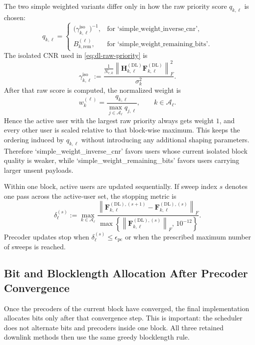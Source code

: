 \documentclass[11pt]{article}
\newcommand{\Aset}{\mathcal{A}}
\newcommand{\F}{\mathbf{F}}
\newcommand{\Hc}{\mathbf{H}}
\newcommand{\norm}[1]{\left\lVert #1 \right\rVert}
\newcommand{\DL}{\mathrm{DL}}
\begin{document}
The two simple weighted variants differ only in how the raw priority score $q_{k,\ell}$ is chosen:
\begin{equation}
q_{k,\ell}
=
\begin{cases}
\bigl(\gamma_{k,\ell}^{\mathrm{iso}}\bigr)^{-1},
&
\text{for `simple\_weight\_inverse\_cnr'},
\\[1mm]
B_{k,\mathrm{rem}}^{(\ell)},
&
\text{for `simple\_weight\_remaining\_bits'}.
\end{cases}
\label{eq:dl-raw-priority}
\end{equation}
The isolated CNR used in \eqref{eq:dl-raw-priority} is
\begin{equation}
\gamma_{k,\ell}^{\mathrm{iso}}
:=
\frac{
\frac{1}{N_{r,k}}
\norm{\Hc_{k,\ell}^{(\DL)}\F_{k,\ell}^{(\DL)}}_F^2
}{
\sigma_k^2
}.
\label{eq:dl-iso-cnr}
\end{equation}
After that raw score is computed, the normalized weight is
\begin{equation}
w_k^{(\ell)}
=
\frac{q_{k,\ell}}{\max_{j \in \Aset_\ell} q_{j,\ell}},
\qquad
k \in \Aset_\ell.
\label{eq:dl-weight-normalization}
\end{equation}
Hence the active user with the largest raw priority always gets weight $1$, and every other user is scaled relative to that block-wise maximum. This keeps the ordering induced by $q_{k,\ell}$ without introducing any additional shaping parameters. Therefore `simple\_weight\_inverse\_cnr' favors users whose current isolated block quality is weaker, while `simple\_weight\_remaining\_bits' favors users carrying larger unsent payloads.

Within one block, active users are updated sequentially. If sweep index $s$ denotes one pass across the active-user set, the stopping metric is
\begin{equation}
\delta_\ell^{(s)}
:=
\max_{k \in \Aset_\ell}
\frac{
\norm{\F_{k,\ell}^{(\DL),(s+1)} - \F_{k,\ell}^{(\DL),(s)}}_F
}{
\max\!\left\{\norm{\F_{k,\ell}^{(\DL),(s)}}_F,\,10^{-12}\right\}
}.
\label{eq:delta}
\end{equation}
Precoder updates stop when $\delta_\ell^{(s)} \le \epsilon_{\mathrm{pc}}$ or when the prescribed maximum number of sweeps is reached.

\subsection{Bit and Blocklength Allocation After Precoder Convergence}
Once the precoders of the current block have converged, the final implementation allocates bits only after that convergence step. This is important: the scheduler does not alternate bits and precoders inside one block. All three retained downlink methods then use the same greedy blocklength rule.
\end{document}
